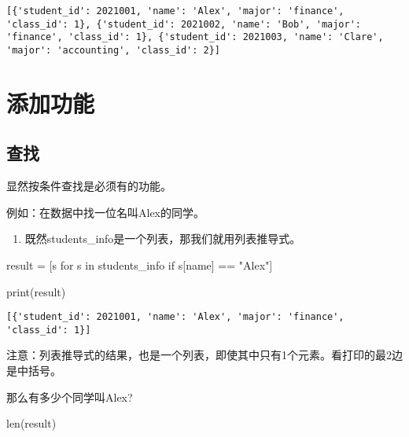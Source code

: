 \documentclass[
  letterpaper,
  DIV=11,
  numbers=noendperiod]{scrreprt}
\newenvironment{Shaded}{\begin{snugshade}}{\end{snugshade}}
\newcommand{\BuiltInTok}[1]{\textcolor[rgb]{0.00,0.23,0.31}{#1}}
\newcommand{\ControlFlowTok}[1]{\textcolor[rgb]{0.00,0.23,0.31}{#1}}
\newcommand{\KeywordTok}[1]{\textcolor[rgb]{0.00,0.23,0.31}{#1}}
\newcommand{\NormalTok}[1]{\textcolor[rgb]{0.00,0.23,0.31}{#1}}
\newcommand{\OperatorTok}[1]{\textcolor[rgb]{0.37,0.37,0.37}{#1}}
\newcommand{\StringTok}[1]{\textcolor[rgb]{0.13,0.47,0.30}{#1}}
\providecommand{\tightlist}{%
  \setlength{\itemsep}{0pt}\setlength{\parskip}{0pt}}\usepackage{longtable,booktabs,array}
\begin{document}
\begin{verbatim}
[{'student_id': 2021001, 'name': 'Alex', 'major': 'finance', 'class_id': 1}, {'student_id': 2021002, 'name': 'Bob', 'major': 'finance', 'class_id': 1}, {'student_id': 2021003, 'name': 'Clare', 'major': 'accounting', 'class_id': 2}]
\end{verbatim}

\hypertarget{ux6dfbux52a0ux529fux80fd}{%
\section{添加功能}\label{ux6dfbux52a0ux529fux80fd}}

\hypertarget{ux67e5ux627e}{%
\subsection{查找}\label{ux67e5ux627e}}

显然按条件查找是必须有的功能。

例如：在数据中找一位名叫Alex的同学。

\begin{enumerate}
\def\labelenumi{\arabic{enumi}.}
\tightlist
\item
  既然students\_info是一个列表，那我们就用列表推导式。
\end{enumerate}

\begin{Shaded}
\begin{Highlighting}[]
\NormalTok{result }\OperatorTok{=}\NormalTok{ [s }\ControlFlowTok{for}\NormalTok{ s }\KeywordTok{in}\NormalTok{ students\_info }\ControlFlowTok{if}\NormalTok{ s[}\StringTok{\textquotesingle{}name\textquotesingle{}}\NormalTok{] }\OperatorTok{==} \StringTok{"Alex"}\NormalTok{]}

\BuiltInTok{print}\NormalTok{(result)}
\end{Highlighting}
\end{Shaded}

\begin{verbatim}
[{'student_id': 2021001, 'name': 'Alex', 'major': 'finance', 'class_id': 1}]
\end{verbatim}

注意：列表推导式的结果，也是一个列表，即使其中只有1个元素。看打印的最2边是中括号。

那么有多少个同学叫Alex?

\begin{Shaded}
\begin{Highlighting}[]
\BuiltInTok{len}\NormalTok{(result)}
\end{Highlighting}
\end{Shaded}
\end{document}
